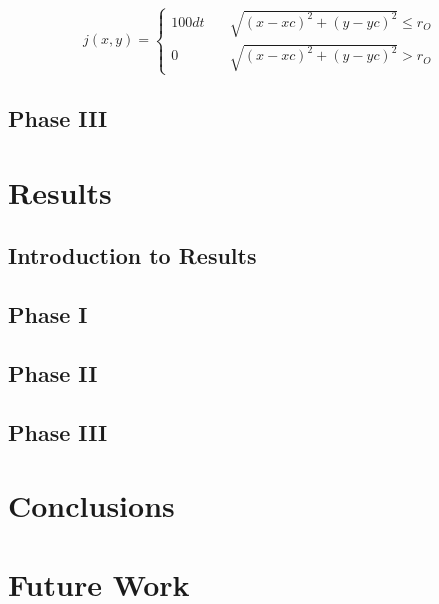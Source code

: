 \documentclass[numbered,pdftex]{ohio-etd}
\begin{document}
\begin{equation}
j(x,y) = \left\{
\begin{array}{ll}
100dt & \quad \sqrt{(x-xc)^2+(y-yc)^2} \leq r_O \\
0 & \quad \sqrt{ (x-xc)^2+(y-yc)^2 } > r_O
\end{array}
\right.
\end{equation}


\section{Phase III}

\chapter{Results}
\section{Introduction to Results}
\section{Phase I}
\section{Phase II}
\section{Phase III}

\chapter{Conclusions}

\chapter{Future Work}


   

\end{document}
